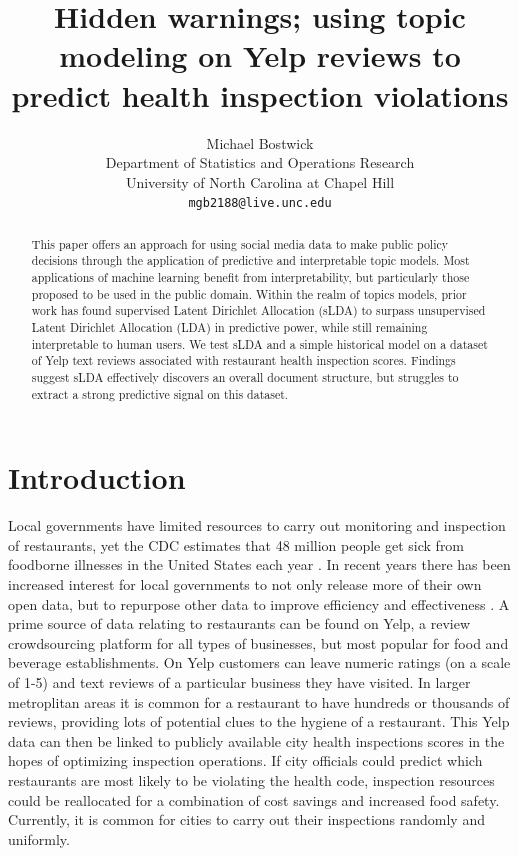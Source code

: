 \documentclass{article}
\title{Hidden warnings; using topic modeling on Yelp reviews to predict health inspection violations}
\author{
  Michael Bostwick\\
  Department of Statistics and Operations Research\\
  University of North Carolina at Chapel Hill\\
  \texttt{mgb2188@live.unc.edu} \\
}
\begin{document}

\maketitle
\begin{abstract}
  This paper offers an approach for using social media data to make public policy decisions through the application of 
  predictive and interpretable topic models. Most applications of machine learning benefit from interpretability, but 
  particularly those proposed to be used in the public domain. Within the realm of topics models, prior work has found 
  supervised Latent Dirichlet Allocation (sLDA) to surpass unsupervised Latent Dirichlet Allocation (LDA) 
  in predictive power, while still remaining interpretable to human users.  We test sLDA and a simple historical model on a 
  dataset of Yelp text reviews associated with restaurant health inspection scores. Findings suggest sLDA effectively 
  discovers an overall document structure, but struggles to extract a strong predictive signal on this dataset.
\end{abstract}

\section{Introduction}
Local governments have limited resources to carry out monitoring and inspection of restaurants, yet the CDC estimates that 48 
million people get sick from foodborne illnesses in the United States each year \cite{cdc}. In recent years there 
has been increased interest for local governments to not only release more of their own open data, but to 
repurpose other data to improve efficiency and effectiveness \cite{glaeser}. A prime source of data relating to restaurants can
be found on Yelp, a review crowdsourcing platform for all types of businesses, but most popular for food and beverage 
establishments. On Yelp customers can leave numeric ratings (on a scale of 1-5) and text reviews of a particular business they
have visited. In larger metroplitan areas it is common for a restaurant to have hundreds or thousands of reviews, providing 
lots of potential clues to the hygiene of a restaurant. This Yelp data can then be linked to publicly available city health inspections scores in the hopes of optimizing inspection operations. If city officials could predict which restaurants are most likely to be violating the health code, inspection resources could be reallocated for a combination of cost savings and increased food safety. Currently, it is common for cities to carry out their inspections randomly and uniformly.
\end{document}
